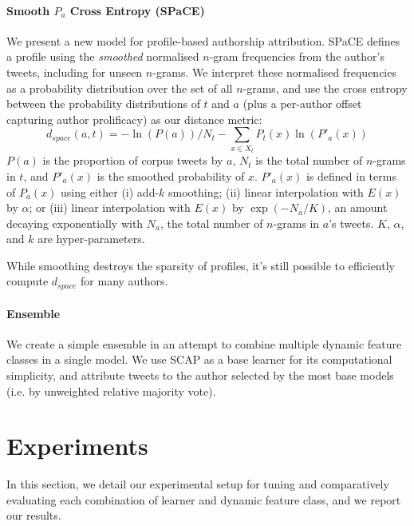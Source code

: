 \documentclass[twocolumn,10pt]{article}
\begin{document}
\paragraph{Smooth $P_a$ Cross Entropy (SPaCE)}
\label{par:space}
We present a new model for profile-based authorship attribution.
SPaCE defines a profile using the \emph{smoothed} normalised
$n$-gram frequencies from the author's tweets, including for
unseen $n$-grams. 
We interpret these normalised frequencies as a probability
distribution over the set of all $n$-grams, and use the cross
entropy between the probability distributions of $t$ and $a$
(plus a per-author offset capturing author prolificacy)
as our distance metric:
$$
d_{space}(a, t) =
    - \ln (P(a)) / N_t
    - \sum_{x \in X_t} P_t(x) \ln (P'_a(x))
$$
$P(a)$ is the proportion of corpus tweets by $a$,
$N_t$ is the total number of $n$-grams in $t$, and
$P'_a(x)$ is the smoothed probability of $x$.
$P'_a(x)$ is defined in terms of $P_a(x)$ using either
(i)   add-$k$ smoothing;
(ii)  linear interpolation with $E(x)$ by $\alpha$; or
(iii) linear interpolation with $E(x)$ by $\exp(-N_a/K)$,
      an amount decaying exponentially with $N_a$,
      the total number of $n$-grams in $a$'s tweets.
$K$, $\alpha$, and $k$ are hyper-parameters.

While smoothing destroys the sparsity of profiles, it's still
possible to efficiently compute $d_{space}$ for many authors.\footnotemark
{}

\paragraph{Ensemble}
We create a simple ensemble in an attempt to combine multiple
dynamic feature classes in a single model.
We use SCAP as a base learner for its computational simplicity,
and attribute tweets to the author selected by the most
base models (i.e. by unweighted relative majority vote).




\section{Experiments}
In this section, we detail our experimental setup for tuning
and comparatively evaluating each combination of learner and dynamic feature class, and we report our results.
\end{document}
